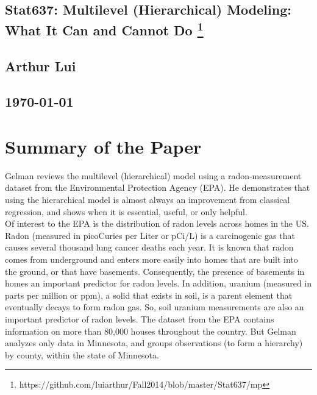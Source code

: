 \documentclass{article}
\begin{document}
\begin{center}
  \section*{\textbf{Stat637: Multilevel (Hierarchical) Modeling: What It Can and Cannot Do}
    \footnote{https://github.com/luiarthur/Fall2014/blob/master/Stat637/mp}
  }  
  \subsection*{\textbf{Arthur Lui}}
  \subsection*{\noindent\today}
\end{center}

\section{Summary of the Paper}
Gelman reviews the multilevel (hierarchical) model using a radon-measurement
dataset from the Environmental Protection Agency (EPA). He demonstrates that
using the hierarchical model is almost always an improvement from classical
regression, and shows when it is essential, useful, or only helpful.\\

\noindent
Of interest to the EPA is the distribution of radon levels across homes in the
US. Radon (measured in picoCuries per Liter or pCi/L) is a carcinogenic gas
that causes several thousand lung cancer deaths each year. It is known that
radon comes from underground and enters more easily into homes that are built
into the ground, or that have basements.  Consequently, the presence of
basements in homes an important predictor for radon levels. In addition,
uranium (measured in parts per million or ppm), a solid that exists in soil, is
a parent element that eventually decays to form radon gas. So, soil uranium
measurements are also an important predictor of radon levels. The dataset from
the EPA contains information on more than 80,000 houses throughout the country.
But Gelman analyzes only data in Minnesota, and groups observations (to form a
hierarchy) by county, within the state of Minnesota.\\
\end{document}
